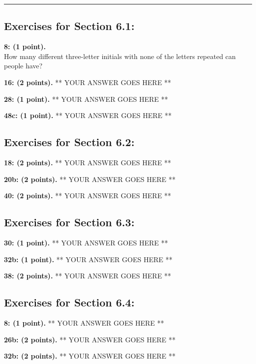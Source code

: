 \documentclass[12pt]{article}  %
\begin{document}
\rule{6in}{.1pt}       %


\subsection*{Exercises for Section 6.1:}     

\noindent
{\bf 8: (1 point).}\\
\noindent
How many different three-letter initials with none of the letters repeated can people have?

\noindent
{\bf 16: (2 points).}
** YOUR ANSWER GOES HERE **

\noindent
{\bf 28: (1 point).}
** YOUR ANSWER GOES HERE **

\noindent
{\bf 48c: (1 point).}
** YOUR ANSWER GOES HERE **

\subsection*{Exercises for Section 6.2:}     
\noindent
{\bf 18: (2 points).}
** YOUR ANSWER GOES HERE **

\noindent
{\bf 20b: (2 points).}
** YOUR ANSWER GOES HERE **

\noindent
{\bf 40: (2 points).}
** YOUR ANSWER GOES HERE **

\subsection*{Exercises for Section 6.3:}     

\noindent
{\bf 30: (1 point).}
** YOUR ANSWER GOES HERE **


\noindent
{\bf 32b: (1 point).}
** YOUR ANSWER GOES HERE **

\noindent
{\bf 38: (2 points).}
** YOUR ANSWER GOES HERE **


\subsection*{Exercises for Section 6.4:}     

\noindent
{\bf 8: (1 point).}
** YOUR ANSWER GOES HERE **

\noindent
{\bf 26b: (2 points).}
** YOUR ANSWER GOES HERE **

\noindent
{\bf 32b: (2 points).}
** YOUR ANSWER GOES HERE **
\end{document}
